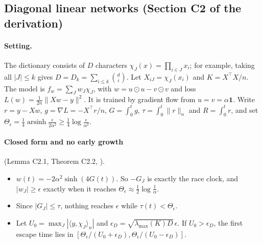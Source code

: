 \subsection{Diagonal linear networks (Section C2 of the derivation)}\label{app:discrete:diag}

\paragraph{Setting.} The dictionary consists of $D$ characters $\chi_J(x)=\prod_{i\in J}x_i$; for example, taking all $|J|\le k$ gives $D=D_k=\sum_{i\le k}\binom di$. Let $X_{iJ}=\chi_J(x_i)$ and $K=X^\top X/n$. The model is $f_w=\sum_Jw_J\chi_J$, with $w=u\odot u-v\odot v$ and loss $L(w)=\frac1{2n}\|Xw-y\|^2$. It is trained by gradient flow from $u=v=\alpha\mathbf1$. Write $r=y-Xw$, $g=\nabla L=-X^\top r/n$, $G=\int_0^tg$, $\tau=\int_0^t\|r\|_n$ and $R=\int_0^tr$, and set $\Theta_\epsilon=\frac14\operatorname{arsinh}\frac\epsilon{2\alpha^2}\ge\frac14\log\frac\epsilon{\alpha^2}$.

\paragraph{Closed form and no early growth} (Lemma C2.1, Theorem C2.2, ).
\begin{itemize}[nosep]
\item $w(t)=-2\alpha^2\sinh(4G(t))$. So $-G_J$ is exactly the race clock, and $|w_J|\ge\epsilon$ exactly when it reaches $\Theta_\epsilon\approx\frac12\log\frac1\alpha$.
\item Since $|G_J|\le\tau$, nothing reaches $\epsilon$ while $\tau(t)<\Theta_\epsilon$.
\item Let $U_0=\max_J|\langle y,\chi_J\rangle_n|$ and $\epsilon_D=\sqrt{\lambda_{\max}(K)D}\,\epsilon$. If $U_0>\epsilon_D$, the first escape time lies in $[\Theta_\epsilon/(U_0+\epsilon_D),\Theta_\epsilon/(U_0-\epsilon_D)]$.
\end{itemize}

